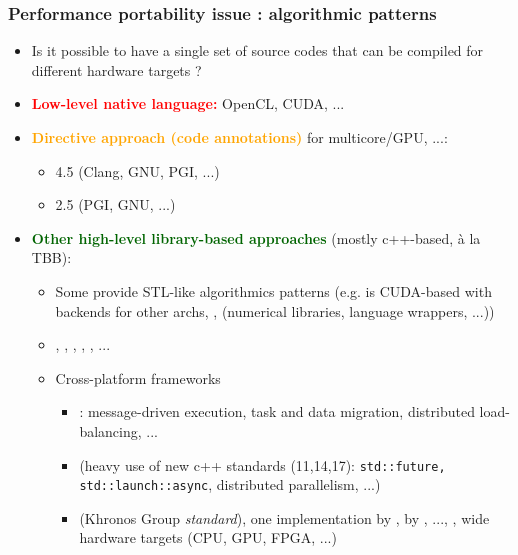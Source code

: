 \begin{frame}
  \frametitle{Performance portability issue : algorithmic patterns}

  \begin{itemize}
  \item Is it possible to have a single set of source codes that can be compiled for different hardware targets ?
  \item \textcolor{red}{\textbf{Low-level native language:}} OpenCL, CUDA, ...
  \item \textcolor{orange}{\textbf{Directive approach (code annotations)}} for multicore/GPU, ...: 
    \begin{itemize}
    \item {} 4.5 (Clang, GNU, PGI, ...)
    \item {} 2.5 (PGI, GNU, ...)
    \end{itemize}
  \item \textcolor{darkgreen}{\textbf{Other high-level library-based approaches}} (mostly c++-based, à la TBB):
    \begin{itemize}
    \item Some provide STL-like algorithmics patterns (e.g.  is CUDA-based with backends for other archs, ,  (numerical libraries, language wrappers, ...))
    \item {}, , , , , ...
    \item Cross-platform frameworks
      \begin{itemize}
      \item {}: message-driven execution, task and data migration, distributed load-balancing, ...
      \item {} (heavy use of new c++ standards (11,14,17): \texttt{std::future, std::launch::async}, distributed parallelism, ...)
      \item {} (Khronos Group \textit{standard}), one implementation by , by , ..., , wide hardware targets (CPU, GPU, FPGA, ...)

\end{itemize}
\end{itemize}
\end{itemize}
\end{frame}
